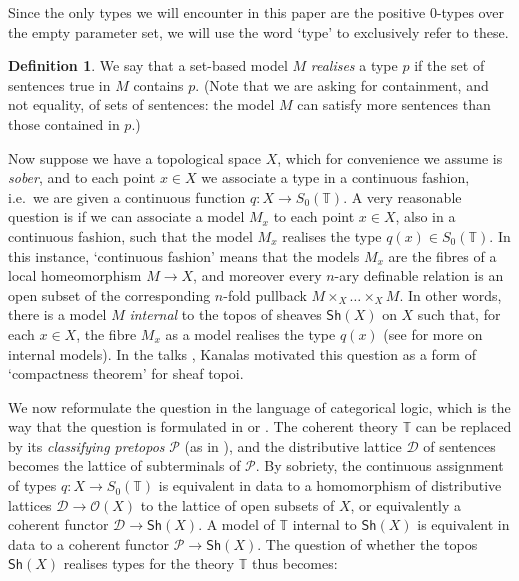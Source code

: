 \documentclass{article}
\theoremstyle{plain}
\theoremstyle{definition}
\newtheorem{df}[thm]{Definition}
\newcommand{\dcat}{\mathcal{D}}
\newcommand{\pretopos}{\mathcal{P}}
\newcommand{\Sh}{\mathsf{Sh}}
\newcommand{\theory}{\mathbb{T}}
\newcommand{\opens}{\mathcal{O}}
\begin{document}
	Since the only types we will encounter in this paper are the positive $0$-types over the empty parameter set, we will use the word `type' to exclusively refer to these.
	\begin{df}\label{df:realise}
		We say that a set-based model $M$ \emph{realises} a type $p$ if the set of sentences true in $M$ {contains} $p$.  (Note that we are asking for containment, and not equality, of sets of sentences: the model $M$ can satisfy more sentences than those contained in $p$.)
	\end{df}
	
	
	Now suppose we have a topological space $X$, which for convenience we assume is \emph{sober}, and to each point $x \in X$ we associate a type in a continuous fashion, i.e.\ we are given a continuous function $q \colon X \to S_0(\theory)$.  A very reasonable question is if we can associate a model $M_x$ to each point $x \in X$, also in a continuous fashion, such that the model $M_x$ realises the type $q(x) \in S_0(\theory)$. In this instance, `continuous fashion' means that the models $M_x$ are the fibres of a local homeomorphism $M \to X$, and moreover every $n$-ary definable relation is an open subset of the corresponding $n$-fold pullback $M \times_X \dots \times_X M$.  In other words, there is a model $M$ \emph{internal} to the topos of sheaves $\Sh(X)$ on $X$ such that, for each $x \in X$, the fibre $M_x$ as a model realises the type $q(x)$ (see \cite[\S D1.2]{elephant} for more on internal models).  In the talks \cite{kanalas_talk_3,kanalas_talk_2}, Kanalas motivated this question as a form of `compactness theorem' for sheaf topoi.
	
	We now reformulate the question in the language of categorical logic, which is the way that the question is formulated in \cite{kanalas_apal} or \cite[Defintion 8.8]{kanalas_phd}.  The coherent theory $\theory$ can be replaced by its \emph{classifying pretopos} $\pretopos$ (as in \cite[\S 8.4]{makkai_reyes}), and the distributive lattice $\dcat$ of sentences becomes the lattice of subterminals of $\pretopos$.  By sobriety, the continuous assignment of types $q \colon X \to S_0(\theory)$ is equivalent in data to a homomorphism of distributive lattices $\dcat \to \opens(X)$ to the lattice of open subsets of $X$, or equivalently a coherent functor $\dcat \to \Sh(X)$.  A model of $\theory$ internal to $\Sh(X)$ is equivalent in data to a coherent functor $\pretopos \to \Sh(X)$.  The question of whether the topos $\Sh(X)$ realises types for the theory $\theory$ thus becomes:
	
\end{document}
